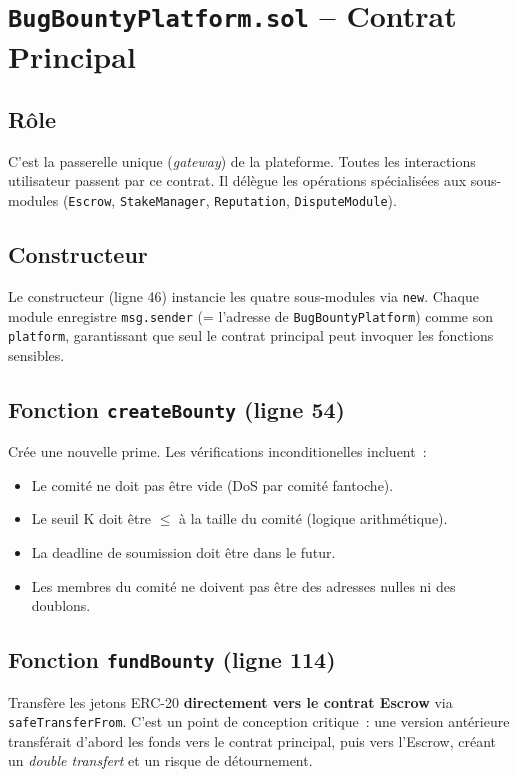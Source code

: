 \documentclass[12pt, a4paper]{report}
\begin{document}
\section{\texttt{BugBountyPlatform.sol} -- Contrat Principal}

\subsection{R\^{o}le}
C'est la passerelle unique (\textit{gateway}) de la plateforme. Toutes les interactions utilisateur passent par ce contrat. Il d\'{e}l\`{e}gue les op\'{e}rations sp\'{e}cialis\'{e}es aux sous-modules (\texttt{Escrow}, \texttt{StakeManager}, \texttt{Reputation}, \texttt{DisputeModule}).

\subsection{Constructeur}
Le constructeur (ligne 46) instancie les quatre sous-modules via \texttt{new}. Chaque module enregistre \texttt{msg.sender} (= l'adresse de \texttt{BugBountyPlatform}) comme son \texttt{platform}, garantissant que seul le contrat principal peut invoquer les fonctions sensibles.

\subsection{Fonction \texttt{createBounty} (ligne 54)}
Cr\'{e}e une nouvelle prime. Les v\'{e}rifications inconditionelles incluent~:
\begin{itemize}
    \item Le comit\'{e} ne doit pas \^{e}tre vide (DoS par comit\'{e} fantoche).
    \item Le seuil K doit \^{e}tre $\leq$ \`{a} la taille du comit\'{e} (logique arithm\'{e}tique).
    \item La deadline de soumission doit \^{e}tre dans le futur.
    \item Les membres du comit\'{e} ne doivent pas \^{e}tre des adresses nulles ni des doublons.
\end{itemize}

\subsection{Fonction \texttt{fundBounty} (ligne 114)}
Transfère les jetons ERC-20 \textbf{directement vers le contrat Escrow} via \texttt{safeTransferFrom}. C'est un point de conception critique~: une version ant\'{e}rieure transf\'{e}rait d'abord les fonds vers le contrat principal, puis vers l'Escrow, cr\'{e}ant un \textit{double transfert} et un risque de d\'{e}tournement.
\end{document}
